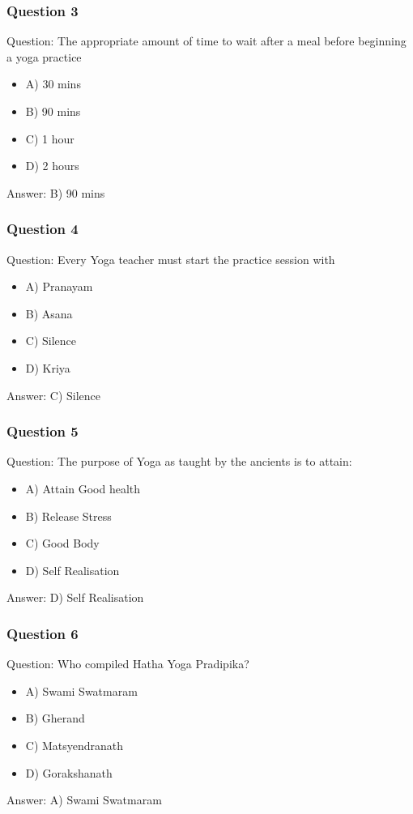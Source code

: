 \begin{frame}[fragile]\frametitle{Question 3}
Question: The appropriate amount of time to wait after a meal before beginning a yoga practice
\begin{itemize}
\item A) 30 mins
\item B) 90 mins
\item C) 1 hour
\item D) 2 hours
\end{itemize}
Answer: B) 90 mins
\end{frame}

\begin{frame}[fragile]\frametitle{Question 4}
Question: Every Yoga teacher must start the practice session with
\begin{itemize}
\item A) Pranayam
\item B) Asana
\item C) Silence
\item D) Kriya
\end{itemize}
Answer: C) Silence
\end{frame}

\begin{frame}[fragile]\frametitle{Question 5}
Question: The purpose of Yoga as taught by the ancients is to attain:
\begin{itemize}
\item A) Attain Good health
\item B) Release Stress
\item C) Good Body
\item D) Self Realisation
\end{itemize}
Answer: D) Self Realisation
\end{frame}

\begin{frame}[fragile]\frametitle{Question 6}
Question: Who compiled Hatha Yoga Pradipika?
\begin{itemize}
\item A) Swami Swatmaram
\item B) Gherand
\item C) Matsyendranath
\item D) Gorakshanath
\end{itemize}
Answer: A) Swami Swatmaram
\end{frame}

